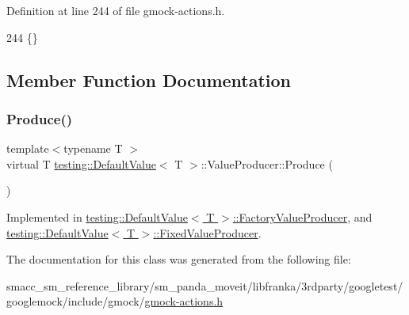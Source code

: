 Definition at line 244 of file gmock-\/actions.\+h.


\begin{DoxyCode}
244 \{\}
\end{DoxyCode}


\subsection{Member Function Documentation}
\mbox{\label{classtesting_1_1DefaultValue_1_1ValueProducer_adb9e38abe068ac2e792b53fd32bd7e96}} 
\subsubsection{\texorpdfstring{Produce()}{Produce()}}
{\footnotesize\ttfamily template$<$typename T $>$ \\
virtual T \hyperlink{classtesting_1_1DefaultValue}{testing\+::\+Default\+Value}$<$ T $>$\+::Value\+Producer\+::\+Produce (\begin{DoxyParamCaption}{ }\end{DoxyParamCaption})\hspace{0.3cm}{\ttfamily [pure virtual]}}



Implemented in \hyperlink{classtesting_1_1DefaultValue_1_1FactoryValueProducer_a246a02412c099b293d905a9749c0fab3}{testing\+::\+Default\+Value$<$ T $>$\+::\+Factory\+Value\+Producer}, and \hyperlink{classtesting_1_1DefaultValue_1_1FixedValueProducer_ad7f695192e9dbc5f54cdb405655e7125}{testing\+::\+Default\+Value$<$ T $>$\+::\+Fixed\+Value\+Producer}.



The documentation for this class was generated from the following file\+:\begin{DoxyCompactItemize}
\item 
smacc\+\_\+sm\+\_\+reference\+\_\+library/sm\+\_\+panda\+\_\+moveit/libfranka/3rdparty/googletest/googlemock/include/gmock/\hyperlink{gmock-actions_8h}{gmock-\/actions.\+h}\end{DoxyCompactItemize}
